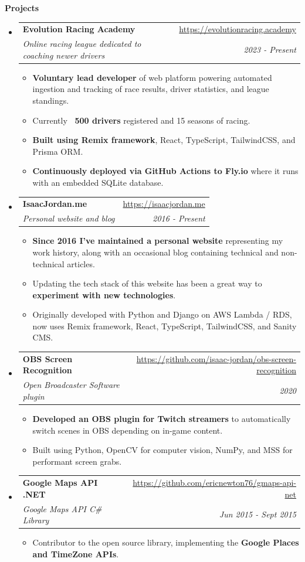 \documentclass[letterpaper,11pt]{article}
\makeatletter
\newcommand{\resitem}[1]{\item #1 \vspace{-1pt}}
\newcommand{\resheading}[1]{{\large \colorbox{mygrey}{\begin{minipage}{\textwidth}{\textbf{#1 \vphantom{p\^{E}}}}\end{minipage}}}}
\newcommand{\ressubheading}[4]{
\begin{tabular*}{7.0in}{l@{\extracolsep{\fill}}r}
	\textbf{#1} & #2 \\
	\textit{#3} & \textit{#4} \\
\end{tabular*}\vspace{-6pt}}
\makeatother
\begin{document}
\resheading{Projects}
\begin{itemize}
	\item
		\ressubheading{Evolution Racing Academy}{\url{https://evolutionracing.academy}}
		{Online racing league dedicated to coaching newer drivers}{2023 - Present}
		\begin{itemize}
			\resitem{\textbf{Voluntary lead developer} of web platform powering automated ingestion and tracking of race results, driver statistics, and league standings.}
			\resitem{Currently \textbf{~500 drivers} registered and 15 seasons of racing.}
			\resitem{\textbf{Built using Remix framework}, React, TypeScript, TailwindCSS, and Prisma ORM.}
			\resitem{\textbf{Continuously deployed via GitHub Actions to Fly.io} where it runs with an embedded SQLite database.}
		\end{itemize}

	\item
		\ressubheading{IsaacJordan.me}{\url{https://isaacjordan.me}}
		{Personal website and blog}{2016 - Present}
		\begin{itemize}
			\resitem{\textbf{Since 2016 I've maintained a personal website} representing my work history, along with an occasional blog containing technical and non-technical articles.}
			\resitem{Updating the tech stack of this website has been a great way to \textbf{experiment with new technologies}.}
			\resitem{Originally developed with Python and Django on AWS Lambda / RDS, now uses Remix framework, React, TypeScript, TailwindCSS, and Sanity CMS.}
		\end{itemize}

	\item
		\ressubheading{OBS Screen Recognition}{\url{https://github.com/isaac-jordan/obs-screen-recognition}}
		{Open Broadcaster Software plugin}{2020}
		\begin{itemize}
			\resitem{\textbf{Developed an OBS plugin for Twitch streamers} to automatically switch scenes in OBS depending on in-game content.}
			\resitem{Built using Python, OpenCV for computer vision, NumPy, and MSS for performant screen grabs.}
		\end{itemize}

	\item
		\ressubheading{Google Maps API .NET}{\url{https://github.com/ericnewton76/gmaps-api-net}}
		{Google Maps API C\# Library}{Jun 2015 - Sept 2015}
		\begin{itemize}
			\resitem{Contributor to the open source library, implementing the \textbf{Google Places and TimeZone APIs}.}
		\end{itemize}

\end{itemize}
\end{document}
